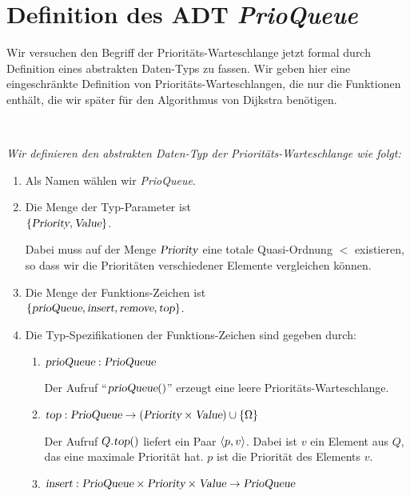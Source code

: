 \section[Definition]{Definition des ADT \textsl{PrioQueue}}
Wir versuchen den Begriff der Priorit\"ats-Warteschlange jetzt formal durch Definition eines
abstrakten Daten-Typs zu fassen.
Wir geben hier eine eingeschr\"ankte Definition von Priorit\"ats-Warteschlangen, die nur die
Funktionen enth\"alt, die wir sp\"ater f\"ur den Algorithmus von Dijkstra ben\"otigen.
\begin{Definition} \hspace*{\fill} \\
{\em
  Wir definieren den abstrakten Daten-Typ der \emph{Priorit\"ats-Warteschlange} wie folgt:
  \begin{enumerate}
  \item Als Namen w\"ahlen wir \textsl{PrioQueue}.
  \item Die Menge der Typ-Parameter ist \\[0.1cm]
        \hspace*{1.3cm} $\{ \textsl{Priority}, \textsl{Value} \}$.

        Dabei muss auf der Menge $\textsl{Priority}$ eine totale Quasi-Ordnung $<$ existieren,
        so dass wir die Priorit\"aten verschiedener Elemente vergleichen k\"onnen. 
  \item Die Menge der Funktions-Zeichen ist \\[0.1cm]
       \hspace*{1.3cm} 
       $\{ \textsl{prioQueue}, \textsl{insert}, \textsl{remove}, \textsl{top} \}$.
  \item Die Typ-Spezifikationen der Funktions-Zeichen sind gegeben durch:
        \begin{enumerate}
        \item $\textsl{prioQueue}: \textsl{PrioQueue}$

              Der Aufruf ``$\textsl{prioQueue}()$'' erzeugt eine leere
              Priorit\"ats-Warteschlange. 
        \item $\textsl{top}: \textsl{PrioQueue}  \rightarrow (\textsl{Priority} \times \textsl{Value}) \cup \{\Omega\}$

              Der Aufruf $Q.\textsl{top}()$ liefert ein Paar $\pair(p,v)$.  Dabei ist $v$ ein Element
              aus $Q$, das eine maximale Priorit\"at hat. $p$ ist die Priorit\"at des Elements $v$.
        \item $\textsl{insert}: \textsl{PrioQueue} \times \textsl{Priority} \times \textsl{Value} \rightarrow \textsl{PrioQueue}$


\end{enumerate}
\end{enumerate}}
\end{Definition}
